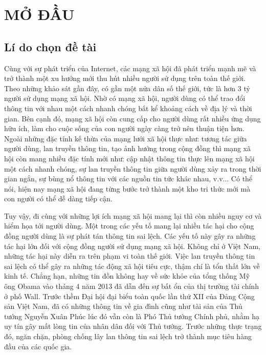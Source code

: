 \chapter* {MỞ ĐẦU}
\thispagestyle{fancy}

\tocless\section {Lí do chọn đề tài}
Cùng với sự phát triển của Internet, các mạng xã hội đã phát triển mạnh mẽ và trở thành một xu hướng mới thu hút nhiều người sử dụng trên toàn thế giới. Theo những khảo sát gần đây, có gần một nửa dân số thế giới, tức là hơn 3 tỷ người sử dụng mạng xã hội. Nhờ có mạng xã hội, người dùng có thể trao đổi thông tin với nhau một cách nhanh chóng bất kể khoảng cách về địa lý và thời gian. Bên cạnh đó, mạng xã hội còn cung cấp cho người dùng rất nhiều ứng dụng hữu ích, làm cho cuộc sống của con người ngày càng trở nên thuận tiện hơn. Ngoài những đặc tính kế thừa của mạng lưới xã hội thực như: tương tác giữa người dùng, lan truyền thông tin, tạo ảnh hưởng trong cộng đồng thì mạng xã hội còn mang nhiều đặc tính mới như: cập nhật thông tin thực lên mạng xã hội một cách nhanh chóng, sự lan truyền thông tin giữa người dùng xảy ra trong thời gian ngắn, sự bùng nổ thông tin với các nguồn tin tức khác nhau, v.v... Có thể nói, hiện nay mạng xã hội đang từng bước trở thành một kho tri thức mới mà con người có thể dễ dàng tiếp cận.

Tuy vậy, đi cùng với những lợi ích mạng xã hội mang lại thì còn nhiều nguy cơ và hiểm họa tới người dùng. Một trong các yếu tố mang lại nhiều tác hại cho cộng đồng người dùng là sự phát tán thông tin sai lệch. Các yếu tố này gây ra những tác hại lớn đối với cộng đồng người sử dụng mạng xã hội. Không chỉ ở Việt Nam, những tác hại này diễn ra trên phạm vi toàn thế giới. Việc lan truyền thông tin sai lệch có thể gây ra những tác động xã hội tiêu cực, thậm chí là tổn thất lớn về kinh tế. Chẳng hạn, những tin đồn không hay về sức khỏe của tổng thống Mỹ ông Obama vào tháng 4 năm 2013 đã dẫn đến sự bất ổn của thị trường tài chính ở phố Wall. Trước thềm Đại hội đại biểu toàn quốc lần thứ XII của Đảng Cộng sản Việt Nam, đã có những thông tin về gia đình cũng như tài sản của Thủ tướng Nguyễn Xuân Phúc lúc đó vẫn còn là Phó Thủ tướng Chính phủ, nhằm hạ uy tín gây mất lòng tin của nhân dân đối với Thủ tướng. Trước những thực trạng đó, ngăn chặn, phòng chống lây lan thông tin sai lệch trở thành mục tiêu hàng đầu của các quốc gia.


